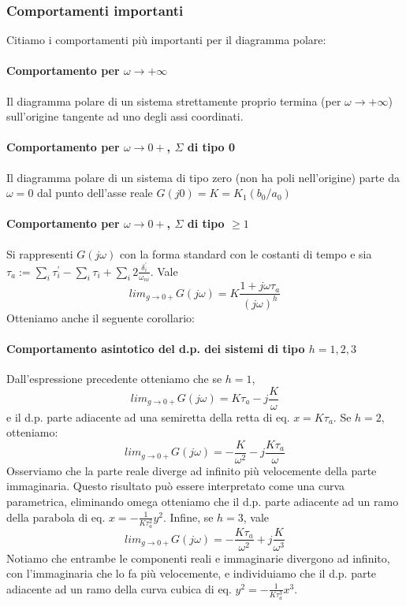\documentclass[11pt]{article}
\begin{document}
\subsubsection{Comportamenti importanti}
Citiamo i comportamenti più importanti per il diagramma polare:
\paragraph{Comportamento per $\omega\rightarrow+\infty$} Il diagramma polare di un sistema strettamente proprio termina (per $\omega\rightarrow+\infty$) sull'origine tangente ad uno degli assi coordinati. 
\paragraph{Comportamento per $\omega\rightarrow0+$, $\Sigma$ di tipo 0} Il diagramma polare di un sistema di tipo zero (non ha poli nell'origine) parte da $\omega=0$ dal punto dell'asse reale $G(j0)=K=K_1(b_0/a_0)$
\paragraph{Comportamento per $\omega\rightarrow0+$, $\Sigma$ di tipo $\ge1$} 
Si rappresenti $G(j\omega)$ con la forma standard con le costanti di tempo e sia $\tau_a := \sum_i \tau_i^{'} - \sum_i \tau_i + \sum_i 2\frac{\delta_i^{'}}{\omega_{ni}}$. Vale 
\begin{displaymath}
    lim_{g\rightarrow0+} G(j\omega) = K\frac{1+j\omega\tau_a}{(j\omega)^h}
\end{displaymath}
Otteniamo anche il seguente corollario:
\paragraph{Comportamento asintotico del d.p. dei sistemi di tipo $h=1,2,3$}
Dall'espressione precedente otteniamo che se $h=1$, 
\begin{displaymath}
    lim_{g\rightarrow0+} G(j\omega) = K\tau_a - j\frac{K}{\omega}
\end{displaymath}
e il d.p. parte adiacente ad una semiretta della retta di eq. $x=K\tau_a$.
Se $h=2$, otteniamo:
\begin{displaymath}
    lim_{g\rightarrow0+} G(j\omega) = -\frac{K}{\omega^2} - j\frac{K\tau_a}{\omega}
\end{displaymath}
Osserviamo che la parte reale diverge ad infinito più velocemente della parte immaginaria. Questo risultato può essere interpretato come una curva parametrica, eliminando omega otteniamo che il d.p. parte adiacente ad un ramo della parabola di eq. $x=-\frac{1}{K\tau_a^2}y^2$.
Infine, se $h=3$, vale 
\begin{displaymath}
    lim_{g\rightarrow0+} G(j\omega) = -\frac{K\tau_a}{\omega^2} + j\frac{K}{\omega^3}
\end{displaymath}
Notiamo che entrambe le componenti reali e immaginarie divergono ad infinito, con l'immaginaria che lo fa più velocemente, e individuiamo che il d.p. parte adiacente ad un ramo della curva cubica di eq. $y^2=-\frac{1}{K\tau_a^3}x^3$.
\end{document}
